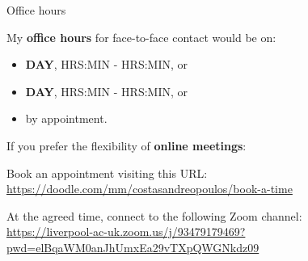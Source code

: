\begin{frame}{Office hours}
   
My {\bf office hours} for face-to-face contact would be on:
\begin{itemize}
  \item {\bf DAY}, HRS:MIN - HRS:MIN, or
  \item {\bf DAY}, HRS:MIN - HRS:MIN, or
  \item by appointment.
\end{itemize}
    
\vspace{0.3cm}

If you prefer the flexibility of {\bf online meetings}:
\begin{itemize}
{\small
  \item 
  Book an appointment visiting this URL:
  {\scriptsize 
    \href{https://doodle.com/mm/costasandreopoulos/book-a-time}
         {https://doodle.com/mm/costasandreopoulos/book-a-time}
  }
  \item 
  At the agreed time, connect to the following Zoom channel:\\
  {\scriptsize 
    \href{https://liverpool-ac-uk.zoom.us/j/93479179469?pwd=elBqaWM0anJhUmxEa29vTXpQWGNkdz09}
         {https://liverpool-ac-uk.zoom.us/j/93479179469?pwd=elBqaWM0anJhUmxEa29vTXpQWGNkdz09}
  }
}
\end{itemize}
 
\end{frame}
 

